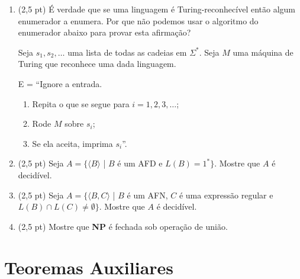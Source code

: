 \documentclass[12pt,a4paper,oneside]{article}
\begin{document}
\begin{enumerate}
	
	\item (2,5 pt) É verdade que se uma linguagem é Turing-reconhecível então algum enumerador a enumera. Por que não podemos usar o algoritmo do enumerador abaixo para provar esta afirmação? 
	
	Seja $s_1, s_2, \ldots$ uma lista de todas as cadeias em $\Sigma^*$. Seja $M$ uma máquina de Turing que reconhece uma dada linguagem.

E = ``Ignore a entrada.
	\begin{enumerate}
		\item Repita o que se segue para $i = 1,2,3, \ldots$;
		\item Rode $M$ sobre $s_i$;
		\item Se ela aceita, imprima $s_i$''.
	\end{enumerate}
	
	\item (2,5 pt)  Seja $A = \{ \langle B \rangle$ | $B$ é um AFD e $L(B) = 1^* \}$. Mostre que $A$ é decidível.
	
	\item (2,5 pt)  Seja $A = \{ \langle B,C \rangle$ | $B$ é um AFN, $C$ é uma expressão regular e $L(B) \cap L(C) \not= \emptyset \}$. Mostre que $A$ é decidível.
	
	\item (2,5 pt) Mostre que {\bf NP} é fechada sob operação de união.
	
\end{enumerate}

\section*{Teoremas Auxiliares}
\end{document}
